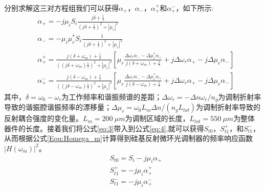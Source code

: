 分别求解这三对方程组我们可以获得$\alpha_+$，$\alpha_-$，$\alpha_+^+$和$\alpha_+^-$，如下所示:
\begin{subequations}  \label{eq:3}
	\begin{align}  
	&\alpha_+ = -j\mu_iS_i \frac{j\delta+\frac{1}{\tau}}{(j\delta+\frac{1}{\tau})^2+|\mu_r|^2}  	\label{eq:3A}\\
	&\alpha_- = -\mu_i\mu_r^*S_i \frac{1}{(j\delta+\frac{1}{\tau})^2+|\mu_r|^2}  	\label{eq:3B}\\	
	&\alpha_+^+ = \frac{j(\delta+\omega_m)+\frac{1}{\tau}}{((j\delta+\omega_m)\frac{1}{\tau})^2+|\mu_r|^2}\left[\mu_r\frac{\Delta \omega_r\alpha_- - \Delta\mu_r^*\alpha_+}{j(\delta+\omega_m)+\frac{1}{\tau}} + j\Delta \omega_r \alpha_+ -j\Delta\mu_r\alpha_-\right]             \label{eq:3C}\\
	&\alpha_+^- = \frac{j(\delta-\omega_m)+\frac{1}{\tau}}{((j\delta-\omega_m)\frac{1}{\tau})^2+|\mu_r|^2}\left[\mu_r\frac{\Delta \omega_r\alpha_- - \Delta\mu_r^*\alpha_+}{j(\delta-\omega_m)+\frac{1}{\tau}} + j\Delta \omega_r \alpha_+ -j\Delta\mu_r\alpha_-\right]             \label{eq:3D}	
	\end{align}
\end{subequations}
其中，$\delta = \omega_0-\omega_r$为工作频率和谐振频谱的差距；$\Delta \omega_r = -\Delta n \omega_r /n_g$为调制折射率导致的谐振腔谐振频率的漂移量；$\Delta \mu_r = \omega_0 L_m \Delta n/(n_g L_{tot})$为调制折射率导致的反射耦合强度的变化量。$L_m = 200~\mu m$为调制区域的长度，$L_{tot} = 550~\mu m$为整体器件的长度。接着我们将公式\ref{eq:3}带入到公式\ref{eq:4},就可以获得$S_{t0}$，$S_{t1}^+$，和$S_{t1}^-$，从而根据公式\ref{Equ:Homega_m}计算得到硅基反射微环光调制器的频率响应函数$|H(\omega_m)|^2$。
\begin{subequations}  \label{eq:4}
	\begin{align}  
	&S_{t0} = S_i-j\mu_i\alpha_+  	\label{eq:4A}\\
	&S_{t1}^+ = -j\mu_i\alpha_+^+ 	\label{eq:4B}\\	
	&S_{t1}^- = -j\mu_i\alpha_+^-            \label{eq:4C}	
	\end{align}
\end{subequations}

